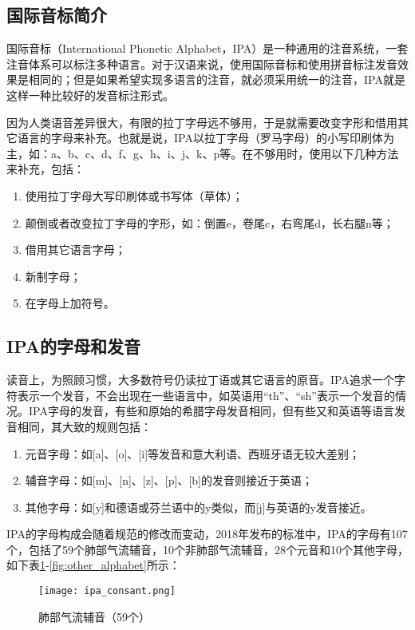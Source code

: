 \documentclass[cn,10pt,math=newtx,citestyle=gb7714-2015,bibstyle=gb7714-2015]{elegantbook}
\begin{document}
\subsection{国际音标简介}

国际音标（International Phonetic Alphabet，IPA）是一种通用的注音系统，一套注音体系可以标注多种语言。对于汉语来说，使用国际音标和使用拼音标注发音效果是相同的；但是如果希望实现多语言的注音，就必须采用统一的注音，IPA就是这样一种比较好的发音标注形式。

因为人类语音差异很大，有限的拉丁字母远不够用，于是就需要改变字形和借用其它语言的字母来补充。也就是说，IPA以拉丁字母（罗马字母）的小写印刷体为主，如：a、b、c、d、f、g、h、i、j、k、p等。在不够用时，使用以下几种方法来补充，包括：

\begin{enumerate}
  \item 使用拉丁字母大写印刷体或书写体（草体）；
  \item 颠倒或者改变拉丁字母的字形，如：倒置e，卷尾c，右弯尾d，长右腿n等；
  \item 借用其它语言字母；
  \item 新制字母；
  \item 在字母上加符号。
\end{enumerate}

\subsection{IPA的字母和发音}

读音上，为照顾习惯，大多数符号仍读拉丁语或其它语言的原音。IPA追求一个字符表示一个发音，不会出现在一些语言中，如英语用“th”、“sh”表示一个发音的情况。IPA字母的发音，有些和原始的希腊字母发音相同，但有些又和英语等语言发音相同，其大致的规则包括：

\begin{enumerate}
  \item 元音字母：如[a]、[o]、[i]等发音和意大利语、西班牙语无较大差别；
  \item 辅音字母：如[m]、[n]、[z]、[p]、[b]的发音则接近于英语；
  \item 其他字母：如[y]和德语或芬兰语中的y类似，而[j]与英语的y发音接近。
\end{enumerate}

IPA的字母构成会随着规范的修改而变动，2018年发布的标准中，IPA的字母有107个，包括了59个肺部气流辅音，10个非肺部气流辅音，28个元音和10个其他字母，如下表\ref{fig:ipa_consant}-\ref{fig:other_alphabet}所示：

\begin{figure}[htbp]
  \centering
  \texttt{[image: ipa\_consant.png]}
  \caption{肺部气流辅音（59个） \label{fig:ipa_consant}}
\end{figure}
\end{document}
